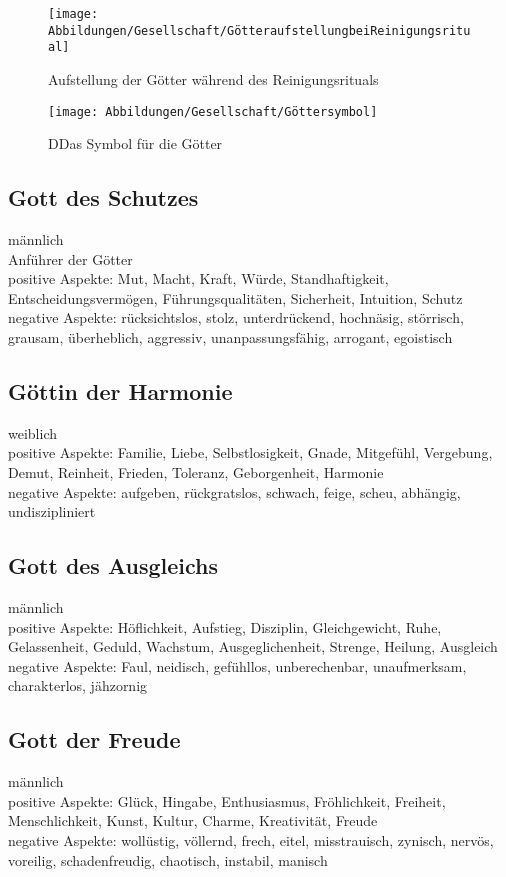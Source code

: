 \begin{figure}
	\centering
	\texttt{[image: Abbildungen/Gesellschaft/GötteraufstellungbeiReinigungsritual]}
	\caption{Aufstellung der Götter während des Reinigungsrituals}
	\label{fig:goetteraufstellung}
\end{figure}

\begin{figure}
	\centering
	\texttt{[image: Abbildungen/Gesellschaft/Göttersymbol]}
	\caption[Göttersymbol]{DDas Symbol für die Götter}
	\label{fig:goettersymbol}
\end{figure}


\subsection{Gott des Schutzes}
männlich\\
Anführer der Götter\\
positive Aspekte: Mut, Macht, Kraft, Würde, Standhaftigkeit, Entscheidungsvermögen, Führungsqualitäten, Sicherheit, Intuition, Schutz\\
negative Aspekte: rücksichtslos, stolz, unterdrückend, hochnäsig, störrisch, grausam, überheblich, aggressiv, unanpassungsfähig, arrogant, egoistisch
\subsection{Göttin der Harmonie}
weiblich\\
positive Aspekte: Familie, Liebe, Selbstlosigkeit, Gnade, Mitgefühl, Vergebung, Demut, Reinheit, Frieden, Toleranz, Geborgenheit, Harmonie\\
negative Aspekte: aufgeben, rückgratslos, schwach, feige, scheu, abhängig, undiszipliniert
\subsection{Gott des Ausgleichs}
männlich\\
positive Aspekte: Höflichkeit, Aufstieg, Disziplin, Gleichgewicht, Ruhe, Gelassenheit, Geduld, Wachstum, Ausgeglichenheit, Strenge, Heilung, Ausgleich\\
negative Aspekte: Faul, neidisch, gefühllos, unberechenbar, unaufmerksam, charakterlos, jähzornig
\subsection{Gott der Freude}
männlich\\
positive Aspekte: Glück, Hingabe, Enthusiasmus, Fröhlichkeit, Freiheit, Menschlichkeit, Kunst, Kultur, Charme, Kreativität, Freude\\
negative Aspekte: wollüstig, völlernd, frech, eitel, misstrauisch, zynisch, nervös, voreilig, schadenfreudig, chaotisch, instabil, manisch
